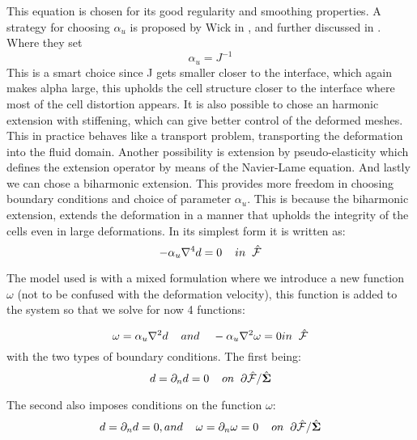 This equation is chosen for its good regularity and smoothing properties.
A strategy for choosing $\alpha_u$ is proposed by Wick in \cite{Wick2011}, and further discussed in \cite{Stein2003}. Where they set 
\begin{equation}
\label{eq:alpha_u}
\alpha_u = J^{-1}
\end{equation} 
This is a smart choice since J gets smaller closer to the interface, which again makes alpha large, this upholds the cell structure closer to the interface where most of the cell distortion appears.  
It is also possible to chose an harmonic extension with stiffening, which can give better control of the deformed meshes. This in practice behaves like a transport problem, transporting the deformation into the fluid domain. Another possibility is extension by pseudo-elasticity which defines the extension operator by means of the Navier-Lame equation. 
And lastly we can chose a biharmonic extension. This provides more freedom in choosing boundary conditions and choice of parameter $\alpha_u$. This is because the biharmonic extension, extends the deformation in a manner that upholds the integrity of the cells even in large deformations. In its simplest form it is written as:
\begin{equation}
- \alpha_u \nabla^4 d = 0 \hspace{4mm}  in \hspace{2mm} \hat{\mathcal{F}}\\
\end{equation}

The model used is with a mixed formulation where we introduce a new function $\omega$ (not to be confused with the deformation velocity), this function is added to the system so that we solve for now 4 functions:

\begin{equation}
\omega = \alpha_u \nabla^2 d \hspace{4mm} and \hspace{4mm} - \alpha_u \nabla^2 \omega = 0   in \hspace{2mm} \hat{\mathcal{F}}
\end{equation}
with the two types of boundary conditions. The first being:
\begin{equation}
d = \partial_n d = 0 \hspace{4mm} on \hspace{2mm} \partial \hat{\mathcal{F}} / \hat{\Sigma}
\end{equation}

The second also imposes conditions on the function $\omega$:	
\begin{equation}
d = \partial_n d = 0 , and \hspace{4mm}   \omega = \partial_n \omega = 0    \hspace{4mm} on \hspace{2mm} \partial \hat{\mathcal{F}} / \hat{\Sigma}
\end{equation}

